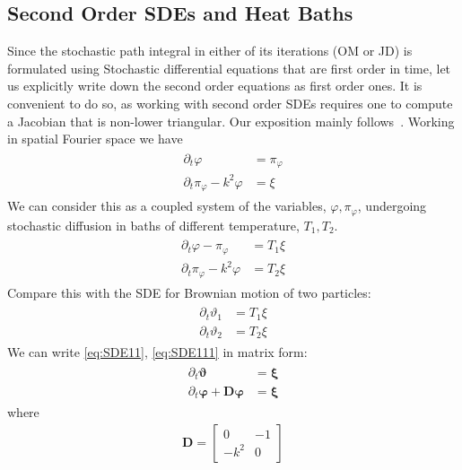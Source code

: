 \documentclass[aps,preprintnumbers,superscriptaddress,longbibliography]{revtex4-1}
\begin{document}
\subsection{Second Order SDEs and Heat Baths}\label{Jacobian}
Since the stochastic path integral in either of its iterations (OM or JD) is formulated using Stochastic differential equations that are first order in time, let us explicitly write down the second order equations as first order ones. It is convenient to do so, as working with second order SDEs requires one to compute a Jacobian that is non-lower triangular. Our exposition mainly follows~\cite{Chaichian2018PathI}. Working in spatial Fourier space we have
\begin{align}
\begin{split}
    \partial_t\varphi&=\pi_{\varphi}\\
    \partial_t\pi_{\varphi}-k^2\varphi&=\xi
    \end{split}
\end{align}
We can consider this as a coupled system of the variables, $\varphi,\pi_{\varphi}$, undergoing stochastic diffusion in baths of different temperature, $T_1,T_2$. 
\begin{align}
\begin{split}
    \label{eq:SDE11}\partial_t\varphi-\pi_{\varphi}&=T_1\xi\\
    \partial_t\pi_{\varphi}-k^2\varphi&=T_2\xi
    \end{split}
\end{align}
Compare this with the SDE for Brownian motion of two particles:\begin{align}
\begin{split}
    \label{eq:SDE111}\partial_t\vartheta_1&=T_1\xi \\ \partial_t\vartheta_2&=T_2\xi\end{split}
\end{align}
We can write \eqref{eq:SDE11}, \eqref{eq:SDE111} in matrix form:
\begin{align}
    \begin{split}
\partial_t\boldsymbol{\vartheta}&=\boldsymbol{\xi}\\\partial_t\boldsymbol{\varphi}+\boldsymbol{D}\boldsymbol{\varphi}&=\boldsymbol{\xi}
    \end{split}
\end{align}
where 
\begin{align}
    \boldsymbol{D}=\begin{bmatrix}
        0&-1\\-k^2&0
    \end{bmatrix}
\end{align}
\end{document}
